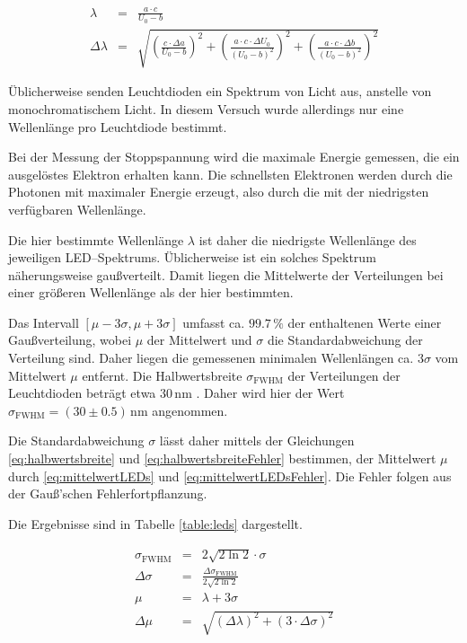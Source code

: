 \documentclass[12pt,a4paper]{scrartcl}
\numberwithin{equation}{section} %
\begin{document}
\begin{eqnarray}
	\lambda &=& \frac{a \cdot c}{U_0 - b} \\
	\Delta \lambda &=&
		\sqrt{
			\left(
				\frac{c \cdot \Delta a}{U_0 - b}
			\right)^2
			+ \left(
				\frac{a \cdot c \cdot \Delta U_0}{(U_0 - b)^2}
			\right)^2
			+ \left(
				\frac{a \cdot c \cdot \Delta b}{(U_0 - b)^2}
			\right)^2
		}
\end{eqnarray}

\noindent
Üblicherweise senden Leuchtdioden ein Spektrum von Licht aus, anstelle von monochromatischem Licht. In diesem Versuch wurde allerdings nur eine Wellenlänge pro Leuchtdiode bestimmt.

Bei der Messung der Stoppspannung wird die maximale Energie gemessen, die ein ausgelöstes Elektron erhalten kann. Die schnellsten Elektronen werden durch die Photonen mit maximaler Energie erzeugt, also durch die mit der niedrigsten verfügbaren Wellenlänge.

Die hier bestimmte Wellenlänge $\lambda$ ist daher die niedrigste Wellenlänge des jeweiligen LED--Spektrums. Üblicherweise ist ein solches Spektrum näherungsweise gaußverteilt. Damit liegen die Mittelwerte der Verteilungen bei einer größeren Wellenlänge als der hier bestimmten.

Das Intervall $[\mu - 3 \sigma, \mu + 3 \sigma]$ umfasst ca. $99.7 \mathrm{\, \%}$ der enthaltenen Werte einer Gaußverteilung, wobei $\mu$ der Mittelwert und $\sigma$ die Standardabweichung der Verteilung sind. \cite{LambacherSchweizerGauß} Daher liegen die gemessenen minimalen Wellenlängen ca. $3 \sigma$ vom Mittelwert $\mu$ entfernt. Die Halbwertsbreite $\sigma_\mathrm{FWHM}$ der Verteilungen der Leuchtdioden beträgt etwa $30 \mathrm{\, nm}$ \cite{uni}. Daher wird hier der Wert $\sigma_\mathrm{FWHM}=(30\pm0.5)\mathrm{\,nm}$ angenommen.

Die Standardabweichung $\sigma$ lässt daher mittels der Gleichungen \eqref{eq:halbwertsbreite} \cite{Halbwertsbreite} und \eqref{eq:halbwertsbreiteFehler} bestimmen, der Mittelwert $\mu$ durch \eqref{eq:mittelwertLEDs} und \eqref{eq:mittelwertLEDsFehler}. Die Fehler folgen aus der Gauß'schen Fehlerfortpflanzung.

Die Ergebnisse sind in Tabelle \ref{table:leds} dargestellt.


\begin{eqnarray}
	\sigma_\mathrm{FWHM} &=& 2 \sqrt{2 \ln{2}} \cdot \sigma
		\label{eq:halbwertsbreite} \\
	\Delta \sigma &=& \frac{\Delta \sigma_\mathrm{FWHM}}{2 \sqrt{2 \ln{2}}}
		\label{eq:halbwertsbreiteFehler} \\
	\mu &=& \lambda + 3 \sigma
		\label{eq:mittelwertLEDs} \\
	\Delta \mu &=& \sqrt{\left(\Delta \lambda\right)^2 + \left(3 \cdot \Delta \sigma \right)^2}
		\label{eq:mittelwertLEDsFehler}
\end{eqnarray}
\end{document}
